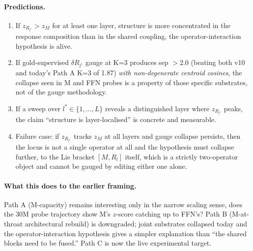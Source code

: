 \documentclass[11pt, a4paper]{article}
\theoremstyle{plain}
\theoremstyle{definition}
\theoremstyle{remark}
\begin{document}
\paragraph{Predictions.}
\begin{enumerate}[nosep,leftmargin=2em]
\item If $z_{R_{l^*}} > z_M$ for at least one layer, structure is more concentrated in the response composition than in the shared coupling, the operator-interaction hypothesis is alive.
\item If gold-supervised $\delta R_{l^*}$ gauge at K=3 produces sep $> 2.0$ (beating both v10 and today's Path A K=3 of 1.87) \emph{with non-degenerate centroid cosines}, the collapse seen in M and FFN probes is a property of those specific substrates, not of the gauge methodology.
\item If a sweep over $l^* \in \{1, \dots, L\}$ reveals a distinguished layer where $z_{R_{l^*}}$ peaks, the claim ``structure is layer-localised'' is concrete and measurable.
\item Failure case: if $z_{R_{l^*}}$ tracks $z_M$ at all layers and gauge collapse persists, then the locus is not a single operator at all and the hypothesis must collapse further, to the Lie bracket $[M, R_l]$ itself, which is a strictly two-operator object and cannot be gauged by editing either one alone.
\end{enumerate}

\paragraph{What this does to the earlier framing.}
Path A (M-capacity) remains interesting only in the narrow scaling sense, does the 30M probe trajectory show M's $z$-score catching up to FFN's?
Path B (M-at-throat architectural rebuild) is downgraded; joint substrates collapsed today and the operator-interaction hypothesis gives a simpler explanation than ``the shared blocks need to be fused.''
Path C is now the live experimental target.
\end{document}
